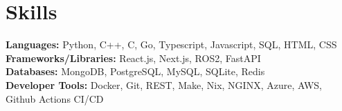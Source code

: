 \documentclass[11pt]{article}
\begin{document}
        \vspace{-5pt}
    
    \vspace{-18pt}

    \section*{ Skills }
    
        
\textbf{Languages:} Python, C++, C, Go, Typescript, Javascript, SQL, HTML, CSS \\
\textbf{Frameworks/Libraries:} React.js, Next.js, ROS2, FastAPI \\
\textbf{Databases:} MongoDB, PostgreSQL, MySQL, SQLite, Redis\\
\textbf{Developer Tools:} Docker, Git, REST, Make, Nix, NGINX, Azure, AWS, Github Actions CI/CD

        \vspace{-5pt}
    
    \vspace{-18pt}
\end{document}
